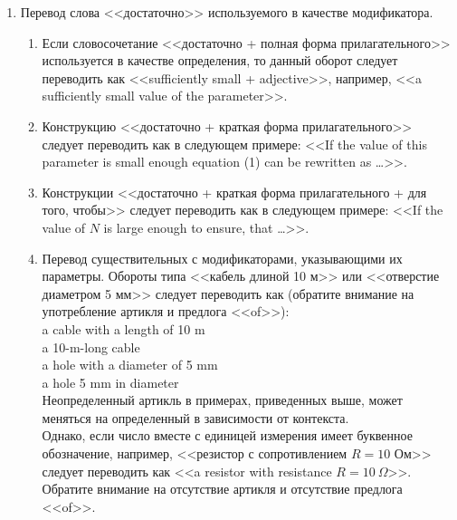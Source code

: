 \documentclass[a5paper, 10pt, twoside, numbers=enddot]{scrartcl}
\begin{document}
\begin{enumerate}
  \item Перевод слова <<достаточно>> используемого в качестве модификатора.
    \begin{enumerate}
      \item Если словосочетание <<достаточно + полная форма прилагательного>> используется в
        качестве определения, то данный оборот следует переводить как <<sufficiently small +
        adjective>>, например, <<a sufficiently small value of the parameter>>.

      \item Конструкцию <<достаточно + краткая форма прилагательного>> следует переводить как в
        следующем примере: <<If the value of this parameter is small enough equation (1) can be
        rewritten as \ldots>>.

      \item Конструкции <<достаточно + краткая форма прилагательного + для того, чтобы>> следует
        переводить как в следующем примере: <<If the value of $N$ is large enough to ensure, that
        \ldots>>.

      \item Перевод существительных с модификаторами, указывающими их параметры. Обороты типа
        <<кабель длиной 10 м>> или <<отверстие диаметром 5 мм>> следует переводить как (обратите
        внимание на употребление артикля и предлога <<of>>):\\ [4pt]
        \textsf{
          a cable with a length of 10 m\\
          a 10-m-long cable\\
          a hole with a diameter of 5 mm\\
          a hole 5 mm in diameter\\ [4pt]
        }
        Неопределенный артикль в примерах, приведенных выше, может меняться на определенный в
        зависимости от контекста.\\ [4pt]
        Однако, если число вместе с единицей измерения имеет буквенное обозначение, например,
        <<резистор с сопротивлением $R=10$ Ом>> следует переводить как <<a resistor with
        resistance $R=10\ \Omega$>>. Обратите внимание на отсутствие артикля и отсутствие предлога
        <<of>>.
    \end{enumerate}


\end{enumerate}
\end{document}
